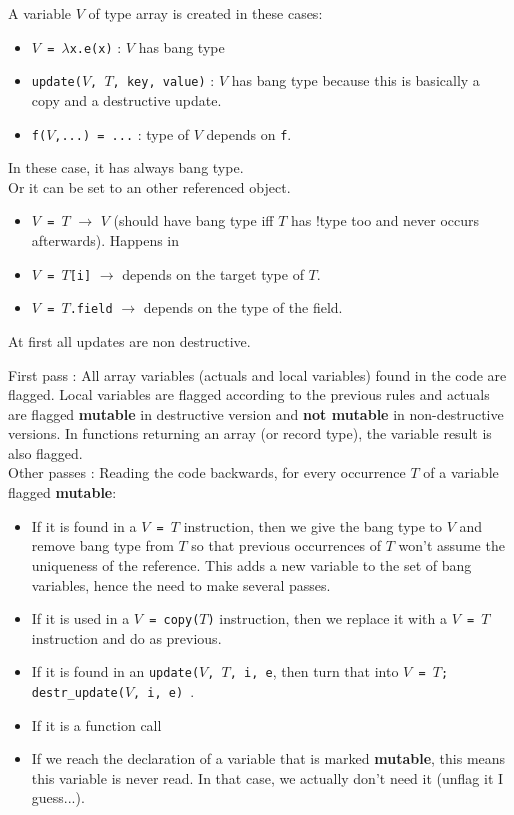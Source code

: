 \documentclass[12pt,a4paper,titlepage]{article}
\newcommand{\cl}[1]{\texttt{#1}}
\begin{document}
A variable $V$ of type array is created in these cases:
\begin{itemize}
\item \cl{$V$ = $\lambda$x.e(x)} : $V$ has bang type
\item \cl{update($V$, $T$, key, value)} : $V$ has bang type because this is basically a copy and a destructive update.
\item \cl{f($V$,...) = ...} : type of $V$ depends on \cl{f}.
\end{itemize}
In these case, it has always bang type.\\
Or it can be set to an other referenced object.
\begin{itemize}
\item \cl{$V$ = $T$} $\rightarrow$ $V$ (should have bang type iff $T$ has !type too and never occurs afterwards). Happens in 
\item \cl{$V$ = $T$[i]} $\rightarrow$ depends on the target type of $T$.
\item \cl{$V$ = $T$.field} $\rightarrow$ depends on the type of the field.
\end{itemize}
At first all updates are non destructive.

First pass : All array variables (actuals and local variables) found in the code are flagged. Local variables are flagged according to the previous rules and actuals are flagged \textbf{mutable} in destructive version and \textbf{not mutable} in non-destructive versions. In functions returning an array (or record type), the variable result is also flagged.\\

Other passes :
Reading the code backwards, for every occurrence $T$ of a variable flagged \textbf{mutable}:
\begin{itemize}
\item If it is found in a \cl{$V$ = $T$} instruction, then we give the bang type to $V$ and remove bang type from $T$ so that previous occurrences of $T$ won't assume the uniqueness of the reference. This adds a new variable to the set of bang variables, hence the need to make several passes.
\item If it is used in a \cl{$V$ = copy($T$)} instruction, then we replace it with a \cl{$V$ = $T$} instruction and do as previous.
\item If it is found in an \cl{update($V$, $T$, i, e}, then turn that into \cl{$V$ = $T$; destr\_update($V$, i, e) }.
\item If it is a function call 
\item If we reach the declaration of a variable that is marked \textbf{mutable}, this means this variable is never read. In that case, we actually don't need it (unflag it I guess...).
\end{itemize}
\end{document}
